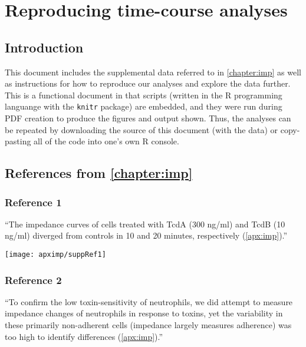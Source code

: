 \chapter[Reproducing time-course analyses]{Reproducing time-course analyses}\label{apx:imp}

\section{Introduction}\label{S:Intro}

This document includes the supplemental data referred to in \ref{chapter:imp}
as well as instructions for how to reproduce our analyses and explore the
data further.
This is a functional document in that scripts (written in the
R programming languange with the \texttt{knitr} package) are embedded, and they were run during
PDF creation to produce the figures and output shown. Thus, the analyses can
be repeated by downloading the source of this document (with the data) or copy-pasting
all of the code into one's own R console.

\section{ References from \ref{chapter:imp} }\label{S:ReFig}

\subsection{ Reference 1 }

``The impedance curves of cells treated with TcdA (300 ng/ml) 
and TcdB (10 ng/ml) diverged from controls in 10 and 20 minutes, 
respectively (\autoref{apx:imp}).''



\singlespacing \begin{knitrout}
\color{fgcolor}
\texttt{[image: apximp/suppRef1]} 
\end{knitrout} \doublespacing


\subsection{ Reference 2 }

``To confirm the low toxin-sensitivity of neutrophils, we did attempt to 
measure impedance changes of neutrophils in response to toxins, yet 
the variability in these primarily non-adherent cells (impedance 
largely measures adherence) was too high to identify 
differences (\autoref{apx:imp}).''

